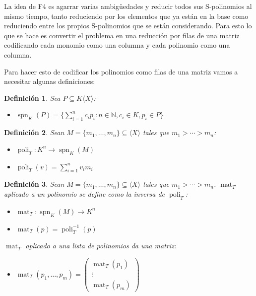 \documentclass{report}
\theoremstyle{customstyle}
\newtheorem{definition}{Definición}[chapter]
\theoremstyle{factstyle}
\DeclareMathOperator{\spn}{spn} %
\DeclareMathOperator{\mat}{mat}
\DeclareMathOperator{\poli}{poli}
\begin{document}
La idea de F4 es agarrar varias ambigüedades y reducir todos sus S-polinomios al mismo tiempo, tanto reduciendo por los elementos que ya están en la base como reduciendo entre los propios S-polinomios que se están considerando. Para esto lo que se hace es convertir el problema en una reducción por filas de una matriz codificando cada monomio como una columna y cada polinomio como una columna.

Para hacer esto de codificar los polinomios como filas de una matriz vamos a necesitar algunas definiciones:

\begin{definition}
Sea $P ⊆ K⟨X⟩$:

\begin{itemize}
  \item $\spn_K(P) = \{∑_{i = 1}^n c_i p_i : n ∈ ℕ, c_i ∈ K, p_i ∈ P\}$
\end{itemize}

\end{definition}

\begin{definition}
Sean $M = \{m_1, …, m_n\} ⊆ ⟨X⟩$ tales que $m_1 > ⋯ > m_n$:

\begin{itemize}
  \item $\poli_T : K^n → \spn_K(M)$
  \item $\poli_T(v) = ∑_{i = 1}^n v_i m_i$
\end{itemize}

\end{definition}

\begin{definition}
Sean $M = \{m_1, …, m_n\} ⊆ ⟨X⟩$ tales que $m_1 > ⋯ > m_n$. $\mat_T$ aplicado a un polinomio se define como la inversa de $\poli_T$:

\begin{itemize}
  \item $\mat_T : \spn_K(M) → K^n$
  \item $\mat_T(p) = \poli_T^{-1}(p)$
\end{itemize}

$\mat_T$ aplicado a una lista de polinomios da una matriz:

\begin{itemize}
  \item $\mat_T(p_1, …, p_m) = \begin{pmatrix} \mat_T(p_1) \\ ⋮ \\ \mat_T(p_m) \end{pmatrix}$
\end{itemize}

\end{definition}
\end{document}
